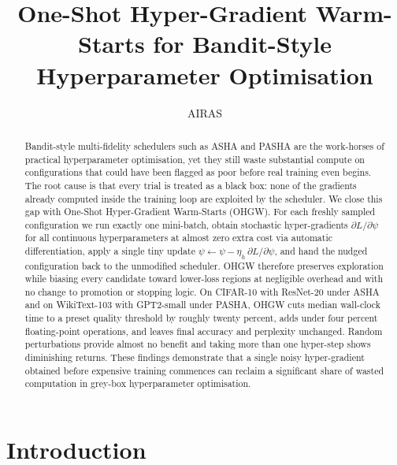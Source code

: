 \documentclass{article} %
\title{One-Shot Hyper-Gradient Warm-Starts for Bandit-Style Hyperparameter Optimisation}
\author{AIRAS}
\begin{document}
\maketitle

\begin{abstract}
Bandit-style multi-fidelity schedulers such as ASHA and PASHA are the work-horses of practical hyperparameter optimisation, yet they still waste substantial compute on configurations that could have been flagged as poor before real training even begins. The root cause is that every trial is treated as a black box: none of the gradients already computed inside the training loop are exploited by the scheduler. We close this gap with One-Shot Hyper-Gradient Warm-Starts (OHGW). For each freshly sampled configuration we run exactly one mini-batch, obtain stochastic hyper-gradients \(\partial L/\partial \psi\) for all continuous hyperparameters at almost zero extra cost via automatic differentiation, apply a single tiny update \(\psi \leftarrow \psi - \eta_h\, \partial L/\partial \psi\), and hand the nudged configuration back to the unmodified scheduler. OHGW therefore preserves exploration while biasing every candidate toward lower-loss regions at negligible overhead and with no change to promotion or stopping logic. On CIFAR-10 with ResNet-20 under ASHA and on WikiText-103 with GPT2-small under PASHA, OHGW cuts median wall-clock time to a preset quality threshold by roughly twenty percent, adds under four percent floating-point operations, and leaves final accuracy and perplexity unchanged. Random perturbations provide almost no benefit and taking more than one hyper-step shows diminishing returns. These findings demonstrate that a single noisy hyper-gradient obtained before expensive training commences can reclaim a significant share of wasted computation in grey-box hyperparameter optimisation.
\end{abstract}

\section{Introduction}\label{sec:intro}
\end{document}
